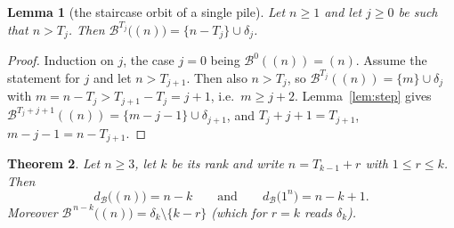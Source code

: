 \documentclass[11pt]{article}
\newtheorem{theorem}{Theorem}[section]
\newtheorem{lemma}[theorem]{Lemma}
\theoremstyle{definition}
\newcommand{\B}{\mathcal{B}}
\newcommand{\dB}{d_{\mathcal{B}}}
\renewcommand{\le}{\leqslant}
\renewcommand{\ge}{\geqslant}
\begin{document}
\begin{lemma}[the staircase orbit of a single pile]\label{lem:pile}
Let $n\ge1$ and let $j\ge0$ be such that $n>T_j$.  Then $\B^{T_j}\bigl((n)\bigr)=\{n-T_j\}\cup\delta_j$.
\end{lemma}

\begin{proof}
Induction on $j$, the case $j=0$ being $\B^0((n))=(n)$.  Assume the statement for $j$ and let $n>T_{j+1}$.  Then
also $n>T_j$, so $\B^{T_j}((n))=\{m\}\cup\delta_j$ with $m=n-T_j>T_{j+1}-T_j=j+1$, i.e.\ $m\ge j+2$.
Lemma~\ref{lem:step} gives $\B^{T_j+j+1}((n))=\{m-j-1\}\cup\delta_{j+1}$, and $T_j+j+1=T_{j+1}$,
$m-j-1=n-T_{j+1}$.
\end{proof}

\begin{theorem}\label{thm:onen}
Let $n\ge3$, let $k$ be its rank and write $n=T_{k-1}+r$ with $1\le r\le k$.  Then
\[
\dB\bigl((n)\bigr)=n-k \qquad\text{and}\qquad \dB\bigl(1^n\bigr)=n-k+1 .
\]
Moreover $\B^{\,n-k}\bigl((n)\bigr)=\delta_k\setminus\{k-r\}$ (which for $r=k$ reads $\delta_k$).
\end{theorem}
\end{document}
